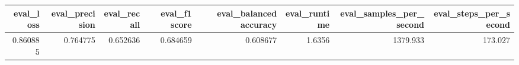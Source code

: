 \begin{tabular}{rrrrrrrr}
\toprule
 eval\_loss &  eval\_precision &  eval\_recall &  eval\_f1 score &  eval\_balanced accuracy &  eval\_runtime &  eval\_samples\_per\_second &  eval\_steps\_per\_second \\
\midrule
  0.860885 &        0.764775 &     0.652636 &       0.684659 &                0.608677 &        1.6356 &                 1379.933 &                173.027 \\
\bottomrule
\end{tabular}
